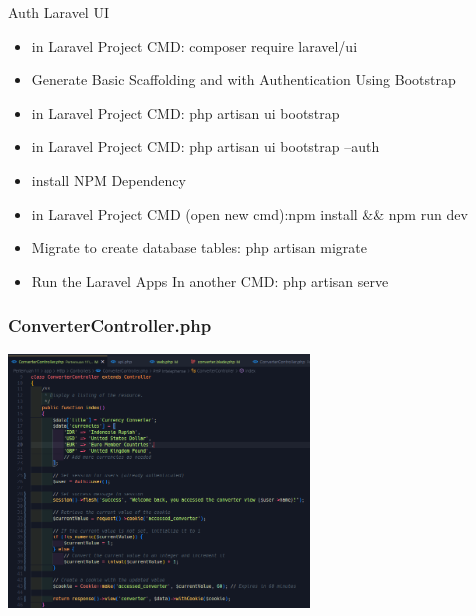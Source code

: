 \documentclass[aspectratio=169, table]{beamer}
\begin{document}
\begin{frame}[fragile]{Auth Laravel UI}
    \begin{itemize}
        \item in Laravel Project CMD: composer require laravel/ui
        \item Generate Basic Scaffolding and with Authentication Using Bootstrap
        \item in Laravel Project CMD: php artisan ui bootstrap
        \item in Laravel Project CMD: php artisan ui bootstrap --auth
        \item install NPM Dependency
        \item in Laravel Project CMD (open new cmd):npm install \&\& npm run dev
        \item Migrate to create database tables: php artisan migrate
        \item Run the Laravel Apps In another CMD: php artisan serve
    \end{itemize}
\end{frame}


\begin{frame}[fragile]
 \frametitle{ConverterController.php}
 \vskip1cm
 \begin{center}
  \includegraphics[width=0.6\textwidth]{classFiles/pertemuan-11-controller-part-1.png}
 \end{center}
\end{frame}
\end{document}
